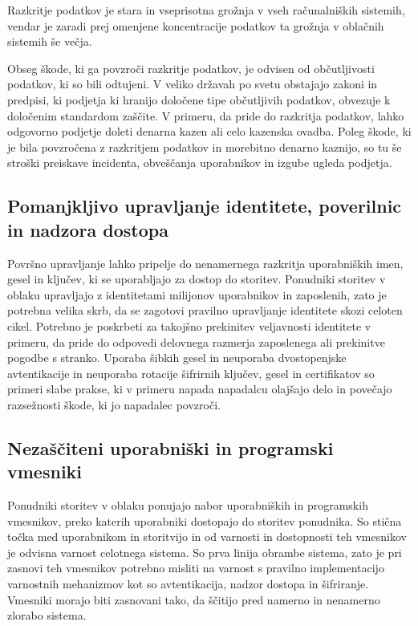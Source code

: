 \documentclass[12pt,a4paper,openany,tikz]{book}
\theoremstyle{plain}
\theoremstyle{definition}
\begin{document}
Razkritje podatkov je stara in vseprisotna grožnja v vseh računalniških sistemih, vendar je zaradi prej omenjene koncentracije podatkov ta grožnja v oblačnih sistemih še večja.

Obseg škode, ki ga povzroči razkritje podatkov, je odvisen od občutljivosti podatkov, ki so bili odtujeni. V veliko državah po svetu obstajajo zakoni in predpisi, ki podjetja ki hranijo določene tipe občutljivih podatkov, obvezuje k določenim standardom zaščite. V primeru, da pride do razkritja podatkov, lahko odgovorno podjetje doleti denarna kazen ali celo kazenska ovadba. Poleg škode, ki je bila povzročena z razkritjem podatkov in morebitno denarno kaznijo, so tu še stroški preiskave incidenta, obveščanja uporabnikov in izgube ugleda podjetja.

\subsection{Pomanjkljivo upravljanje identitete, poverilnic in nadzora dostopa}
\label{sub:Pomanjkljivo upravljanje identitete, poverilnic in nadzora dostopa}

Površno upravljanje lahko pripelje do nenamernega razkritja uporabniških imen, gesel in ključev, ki se uporabljajo za dostop do storitev. Ponudniki storitev v oblaku upravljajo z identitetami milijonov uporabnikov in zaposlenih, zato je potrebna velika skrb, da se zagotovi pravilno upravljanje identitete skozi celoten cikel. Potrebno je poskrbeti za takojšno prekinitev veljavnosti identitete v primeru, da pride do odpovedi delovnega razmerja zaposlenega ali prekinitve pogodbe s stranko. Uporaba šibkih gesel in neuporaba dvostopenjske avtentikacije in neuporaba rotacije šifrirnih ključev, gesel in certifikatov so primeri slabe prakse, ki v primeru napada napadalcu olajšajo delo in povečajo razsežnosti škode, ki jo napadalec povzroči.

\subsection{Nezaščiteni uporabniški in programski vmesniki}
\label{sub:Nezaščiteni uporabniški in programski vmesniki}

Ponudniki storitev v oblaku ponujajo nabor uporabniških in programskih vmesnikov, preko katerih uporabniki dostopajo do storitev ponudnika. So stična točka med uporabnikom in storitvijo in od varnosti in dostopnosti teh vmesnikov je odvisna varnost celotnega sistema. So prva linija obrambe sistema, zato je pri zasnovi teh vmesnikov potrebno misliti na varnost s pravilno implementacijo varnostnih mehanizmov kot so avtentikacija, nadzor dostopa in šifriranje. Vmesniki morajo biti zasnovani tako, da ščitijo pred namerno in nenamerno zlorabo sistema.
\end{document}
